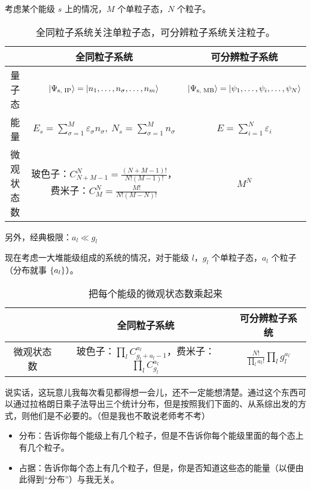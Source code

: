 考虑某个能级 $s$ 上的情况，$M$ 个单粒子态，$N$ 个粒子。
\begin{table}[H]
    \centering
    \begin{tabular}{|c|c|c|}
        \hline
              & 全同粒子系统                                                                                                     & 可分辨粒子系统                                                                    \\
        \hline
        量子态   & $\ket{\Psi_{\text{s, IP}}} = \ket{n_1, \dots, n_{\sigma}, \dots, n_m}$                                     & $\ket{\Psi_{\text{s, MB}}} = \ket{\psi_1, \dots, \psi_{i}, \dots, \psi_N}$ \\
        \hline
        能量    & $E_{s} = \sum_{\sigma = 1}^{M} \varepsilon_{\sigma} n_{\sigma},\ N_{s} = \sum_{\sigma = 1}^{M} n_{\sigma}$ & $E = \sum_{i = 1}^N \varepsilon_{i}$                                       \\
        \hline
        微观状态数 & 玻色子：$C_{N + M - 1}^{N} = \frac{(N + M - 1)!}{N! (M - 1)!}$，费米子：$C_{M}^{N} = \frac{M!}{N! (M - N)!}$        & $M^N$                                                                      \\
        \hline
    \end{tabular}
    \caption{全同粒子系统关注单粒子态，可分辨粒子系统关注粒子。}
\end{table}
另外，经典极限：$a_l \ll g_l$

现在考虑一大堆能级组成的系统的情况，对于能级 $l$，$g_l$ 个单粒子态，$a_l$ 个粒子（分布就事 $\qty{a_l}$）。
\begin{table}[H]
    \centering
    \begin{tabular}{|c|c|c|}
        \hline
              & 全同粒子系统                                                            & 可分辨粒子系统                                             \\
        \hline
        微观状态数 & 玻色子：$\prod_l C_{g_l + a_l - 1}^{a_l}$，费米子：$\prod_l C_{g_l}^{a_l}$ & $\frac{N!}{\prod_{l} a_l!} \prod_{l} g_{l}^{a_{l}}$ \\
        \hline
    \end{tabular}
    \caption{把每个能级的微观状态数乘起来}
\end{table}
说实话，这玩意儿我每次看见都得想一会儿，还不一定能想清楚。通过这个东西可以通过拉格朗日乘子法导出三个统计分布，但是按照我们下面的、从系综出发的方式，则他们是不必要的。（但是我也不敢说老师考不考）

\begin{itemize}
    \item 分布：告诉你每个能级上有几个粒子，但是不告诉你每个能级里面的每个态上有几个粒子。
    \item 占据：告诉你每个态上有几个粒子，但是，你是否知道这些态的能量（以便由此得到“分布”）与我无关。
\end{itemize}

